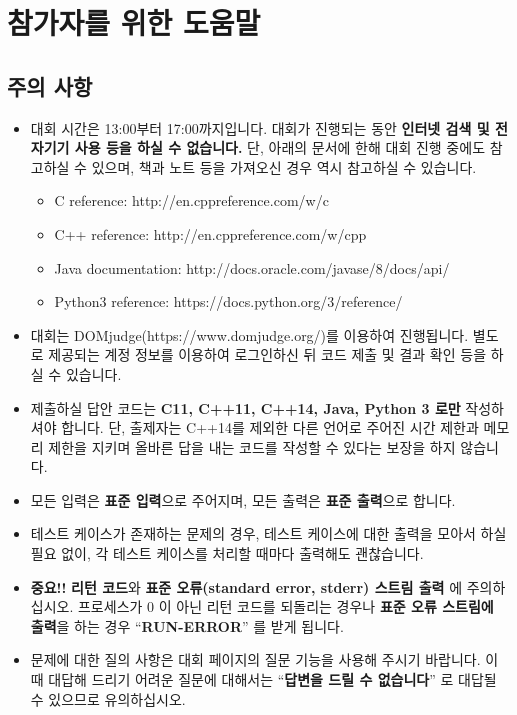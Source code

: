 \section*{참가자를 위한 도움말}

\subsection*{주의 사항}

\begin{itemize}
\item 대회 시간은 13:00부터 17:00까지입니다. 대회가 진행되는 동안 \textbf{인터넷 검색 및 전자기기 사용 등을 하실 수 없습니다.} 단, 아래의 문서에 한해 대회 진행 중에도 참고하실 수 있으며, 책과 노트 등을 가져오신 경우 역시 참고하실 수 있습니다.
\begin{itemize}
  \item C reference: http://en.cppreference.com/w/c
  \item C++ reference: http://en.cppreference.com/w/cpp
  \item Java documentation: http://docs.oracle.com/javase/8/docs/api/
  \item Python3 reference: https://docs.python.org/3/reference/
\end{itemize}
\item 대회는 DOMjudge(https://www.domjudge.org/)를 이용하여 진행됩니다. 별도로 제공되는 계정 정보를 이용하여 로그인하신 뒤 코드 제출 및 결과 확인 등을 하실 수 있습니다.
\item 제출하실 답안 코드는 \textbf{C11, C++11, C++14, Java, Python 3 로만} 작성하셔야 합니다. 단, 출제자는 C++14를 제외한 다른 언어로 주어진 시간 제한과 메모리 제한을 지키며 올바른 답을 내는 코드를 작성할 수 있다는 보장을 하지 않습니다.
\item 모든 입력은 \textbf{표준 입력}으로 주어지며, 모든 출력은 \textbf{표준 출력}으로 합니다.
\item 테스트 케이스가 존재하는 문제의 경우, 테스트 케이스에 대한 출력을 모아서 하실 필요 없이, 각 테스트 케이스를 처리할 때마다 출력해도 괜찮습니다.
\item \textbf{중요!!} \textbf{리턴 코드}와 \textbf{표준 오류(standard error, stderr) 스트림 출력} 에 주의하십시오. 프로세스가 $0$ 이 아닌 리턴 코드를 되돌리는 경우나 \textbf{표준 오류 스트림에 출력}을 하는 경우 ``\textbf{RUN-ERROR}'' 를 받게 됩니다.
\item 문제에 대한 질의 사항은 대회 페이지의 질문 기능을 사용해 주시기 바랍니다. 이 때 대답해 드리기 어려운 질문에 대해서는 ``\textbf{답변을 드릴 수 없습니다}'' 로 대답될 수 있으므로 유의하십시오.
\end{itemize}

